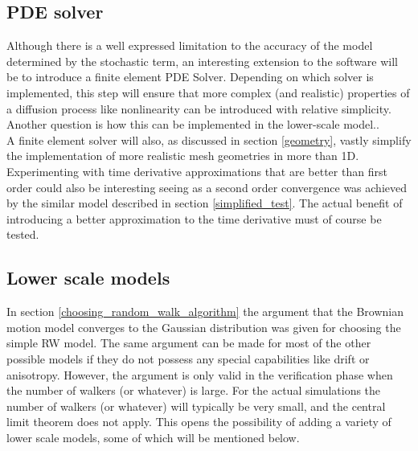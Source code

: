 \subsection{PDE solver}
Although there is a well expressed limitation to the accuracy of the model determined by the stochastic term, an interesting extension to the software will be to introduce a finite element PDE Solver. 
Depending on which solver is implemented, this step will ensure that more complex (and realistic) properties of a diffusion process like nonlinearity can be introduced with relative simplicity. 
Another question is how this can be implemented in the lower-scale model..\\
A finite element solver will also, as discussed in section \ref{geometry}, vastly simplify the implementation of more realistic mesh geometries in more than 1D. \\
Experimenting with time derivative approximations that are better than first order could also be interesting seeing as a second order convergence was achieved by the similar model described in section \ref{simplified_test}. 
The actual benefit of introducing a better approximation to the time derivative must of course be tested.

\subsection{Lower scale models}
In section \ref{choosing_random_walk_algorithm} the argument that the Brownian motion model converges to the Gaussian distribution was given for choosing the simple RW model. 
The same argument can be made for most of the other possible models if they do not possess any special capabilities like drift or anisotropy. 
However, the argument is only valid in the verification phase when the number of walkers (or whatever) is large. 
For the actual simulations the number of walkers (or whatever) will typically be very small, and the central limit theorem does not apply. 
This opens the possibility of adding a variety of lower scale models, some of which will be mentioned below.

% 
% 
